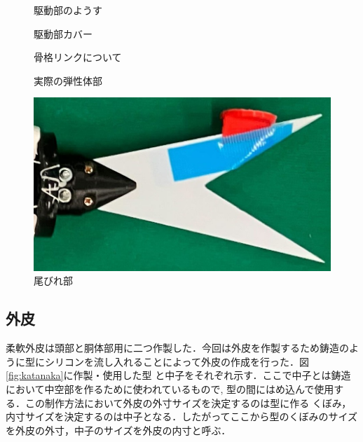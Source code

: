 \begin{figure}[hb]
    \centering
    \begin{minipage}[b]{0.35\linewidth}
        \centering
        \caption{駆動部のようす}
        \label{fig:kudou}
    \end{minipage}
    \hspace{0.1\linewidth}
    \begin{minipage}[b]{0.35\linewidth}
        \centering
        \caption{駆動部カバー}
        \label{fig:cover}
    \end{minipage}
\end{figure}
\begin{figure}[b]
    \centering
    \begin{minipage}[b]{0.35\linewidth}
        \centering
        \caption{骨格リンクについて}
        \label{fig:link2}
    \end{minipage}
    \hspace{0.1\linewidth}
    \begin{minipage}[b]{0.35\linewidth}
        \centering
        \caption{実際の弾性体部}
        \label{fig:real_link}
    \end{minipage}
\end{figure}
\begin{figure}[t]
    \centering
    \includegraphics[width=0.5\linewidth]{chapters/picture/obire.jpg}
    \caption{尾びれ部}
    \label{fig:obire}
\end{figure}

\subsection{外皮}
柔軟外皮は頭部と胴体部用に二つ作製した．今回は外皮を作製するため鋳造のように型にシリコンを流し入れることによって外皮の作成を行った．図\ref{fig:katanaka}に作製・使用した型
と中子をそれぞれ示す．ここで中子とは鋳造において中空部を作るために使われているもので, 型の間にはめ込んで使用する．この制作方法において外皮の外寸サイズを決定するのは型に作る
くぼみ，内寸サイズを決定するのは中子となる．したがってここから型のくぼみのサイズを外皮の外寸，中子のサイズを外皮の内寸と呼ぶ．

